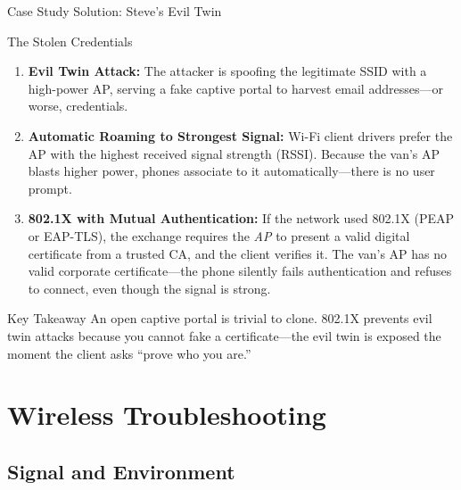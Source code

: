 \documentclass[aspectratio=169]{beamer}
\begin{document}
\begin{frame}{Case Study Solution: Steve's Evil Twin}
    \begin{casesolution}{The Stolen Credentials}
        \footnotesize
        \begin{enumerate}
            \item \textbf{Evil Twin Attack:} The attacker is spoofing the legitimate SSID with a high-power AP, serving a fake captive portal to harvest email addresses---or worse, credentials.
            \item \textbf{Automatic Roaming to Strongest Signal:} Wi-Fi client drivers prefer the AP with the highest received signal strength (RSSI). Because the van's AP blasts higher power, phones associate to it automatically---there is no user prompt.
            \item \textbf{802.1X with Mutual Authentication:} If the network used 802.1X (PEAP or EAP-TLS), the exchange requires the \emph{AP} to present a valid digital certificate from a trusted CA, and the client verifies it. The van's AP has no valid corporate certificate---the phone silently fails authentication and refuses to connect, even though the signal is strong.
        \end{enumerate}
    \end{casesolution}

    \begin{alertblock}{Key Takeaway}
        \footnotesize
        An open captive portal is trivial to clone. 802.1X prevents evil twin attacks because you cannot fake a certificate---the evil twin is exposed the moment the client asks ``prove who you are.''
    \end{alertblock}
\end{frame}

\section{Wireless Troubleshooting}
\subsection{Signal and Environment}
\end{document}
